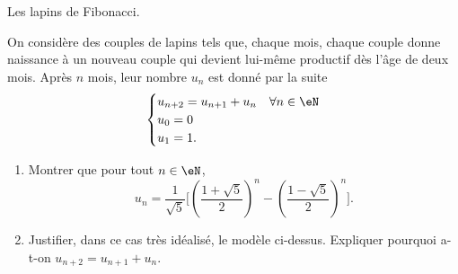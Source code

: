 
\begin{exercice}\label{exoTD3-0011}

	Les lapins de Fibonacci.

	On considère des couples de lapins tels que, chaque mois, chaque couple donne naissance à un nouveau couple qui devient lui-même productif dès l'âge de deux mois. Après $n$ mois, leur nombre $u_n$ est donné par la suite
	\begin{equation}
		\begin{cases}
			u_{n+2}=u_{n+1}+u_n	&	\text{$\forall n\in\eN$}\\
			u_0=0\\
			u_1=1.	&	 
		\end{cases}
	\end{equation}
	\begin{enumerate}
		\item
			Montrer que pour tout $n\in\eN$,
			\begin{equation}
				u_n=\frac{1}{ \sqrt{5} }\Big[ \left( \frac{ 1+\sqrt{5} }{2} \right)^n-\left( \frac{ 1-\sqrt{5} }{2} \right)^n \Big].
			\end{equation}
		\item
			Justifier, dans ce cas très idéalisé, le modèle ci-dessus. Expliquer pourquoi a-t-on $u_{n+2}=u_{n+1}+u_n$.
	\end{enumerate}

\end{exercice}
